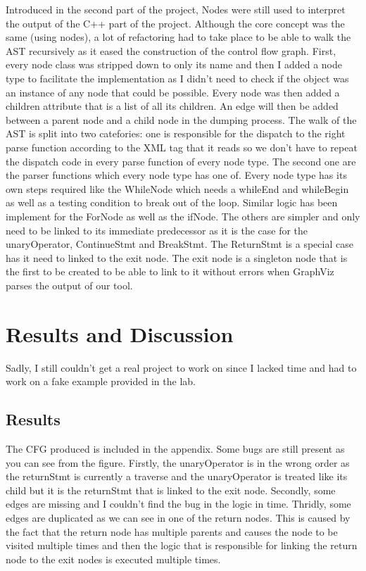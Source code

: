\documentclass[conference,compsoc]{IEEEtran}
\begin{document}
 Introduced in the second part of the project, Nodes were still used
 to interpret the output of the C++ part of the project. Although the core concept
 was the same (using nodes), a lot of refactoring had to take place to be able to walk
 the AST recursively as it eased the construction of the control flow graph. First,
 every node class was stripped down to only its name and then I added a node type to
 facilitate the implementation as I didn't need to check if the object was an instance
 of any node that could be possible. Every node was then added a children attribute
 that is a list of all its children. An edge will then be added between a parent node
 and a child node in the dumping process. The walk of the AST is split into two catefories:
 one is responsible for the dispatch to the right parse function according to the XML tag
 that it reads so we don't have to repeat the dispatch code in every parse function of every
 node type. The second one are the parser functions which every node type has one of. Every
 node type has its own steps required like the WhileNode which needs a whileEnd and whileBegin
 as well as a testing condition to break out of the loop. Similar logic has been implement for
 the ForNode as well as the ifNode. The others are simpler and only need to be linked to its
 immediate predecessor as it is the case for the unaryOperator, ContinueStmt and BreakStmt. The
 ReturnStmt is a special case has it need to linked to the exit node. The exit node is a singleton
 node that is the first to be created to be able to link to it without errors when GraphViz parses
 the output of our tool.

\section{Results and Discussion}

Sadly, I still couldn't get a real project to work on since I lacked time and had to work on a fake example provided in the lab.

\subsection{Results}

The CFG produced is included in the appendix. Some bugs are still present as you can see from the
figure. Firstly, the unaryOperator is in the wrong order as the returnStmt is currently a traverse
and the unaryOperator is treated like its child but it is the returnStmt that is linked to the
exit node. Secondly, some edges are missing and I couldn't find the bug in the logic in time.
 Thridly, some edges are duplicated as we can see in one of the return nodes. This is caused by the
 fact that the return node has multiple parents and causes the node to be visited multiple times and
 then the logic that is responsible for linking the return node to the exit nodes is executed
 multiple times.
\end{document}
